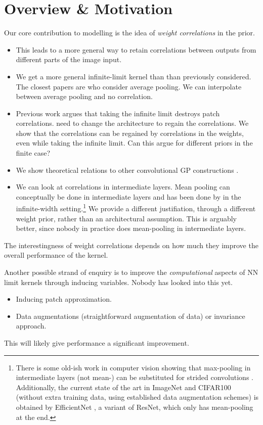 \documentclass{article} %
\begin{document}
\section{Overview \& Motivation}
Our core contribution to modelling is the idea of \emph{weight correlations} in the prior.
\begin{itemize}
    \item This leads to a more general way to retain correlations between outputs from different parts of the image input.
    \item We get a more general infinite-limit kernel than than previously considered. The closest papers are \citet{arora2019exact,li2019enhanced,shankar2020} who consider average pooling. We can interpolate between average pooling and no correlation.
    \item Previous work argues that taking the infinite limit destroys patch correlations. \citet{arora2019exact,li2019enhanced,shankar2020} need to change the architecture to regain the correlations. We show that the correlations can be regained by correlations in the weights, even while taking the infinite limit. Can this argue for different priors in the finite case?
    \item We show theoretical relations to other convolutional GP constructions \citep{markvdw2017convolutional,dutordoir2019tick}.
    \item We can look at correlations in intermediate layers. Mean pooling can conceptually be done in intermediate layers and has been done by \citet{shankar2020} in the infinite-width setting.\footnote{There is some old-ish work in computer vision showing that max-pooling in intermediate layers (not mean-) can be substituted for strided convolutions \citep{springenberg14allconv}. Additionally, the current state of the art in ImageNet and CIFAR100  (without extra training data, using established data augmentation schemes) is obtained by EfficientNet \citep{tan19efficientnet}, a variant of ResNet, which only has mean-pooling at the end.} We provide a different justifiation, through a different weight prior, rather than an architectural assumption. This is arguably better, since nobody in practice does mean-pooling in intermediate layers.
\end{itemize}
The interestingness of weight correlations depends on how much they improve the overall performance of the kernel.

Another possible strand of enquiry is to improve the \emph{computational} aspects of NN limit kernels through inducing variables. Nobody has looked into this yet.
\begin{itemize}
    \item Inducing patch approximation.
    \item Data augmentations (straightforward augmentation of data) or invariance approach.
\end{itemize}
This will likely give performance a significant improvement.
\end{document}

